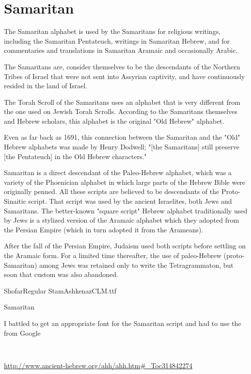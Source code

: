\section{Samaritan}
\label{s:samaritan}
\newfontfamily{}

The Samaritan alphabet is used by the Samaritans for religious writings, including the Samaritan Pentateuch, writings in Samaritan Hebrew, and for commentaries and translations in Samaritan Aramaic and occasionally Arabic.

The Samaritans are, consider themselves to be the descendants of the Northern Tribes of Israel that were not sent into Assyrian captivity, and have continuously resided in the land of Israel.

The Torah Scroll of the Samaritans uses an alphabet that is very different from the one used on Jewish Torah Scrolls. According to the Samaritans themselves and Hebrew scholars, this alphabet is the original "Old Hebrew" alphabet.

Even as far back as 1691, this connection between the Samaritan and the "Old" Hebrew alphabets was made by Henry Dodwell; "[the Samaritans] still preserve [the Pentateuch] in the Old Hebrew characters."

Samaritan is a direct descendant of the Paleo-Hebrew alphabet, which was a variety of the Phoenician alphabet in which large parts of the Hebrew Bible were originally penned. All these scripts are believed to be descendants of the Proto-Sinaitic script. That script was used by the ancient Israelites, both Jews and Samaritans. The better-known "square script" Hebrew alphabet traditionally used by Jews is a stylized version of the Aramaic alphabet which they adopted from the Persian Empire (which in turn adopted it from the Arameans). 

After the fall of the Persian Empire, Judaism used both scripts before settling on the Aramaic form. For a limited time thereafter, the use of paleo-Hebrew (proto-Samaritan) among Jews was retained only to write the Tetragrammaton, but soon that custom was also abandoned.



ShofarRegular StamAshkenazCLM.ttf

\begin{scriptexample}[]{Samaritan}
\bgroup
{}
\egroup
{}
\end{scriptexample}

I battled to get an appropriate font for the Samaritan script and had to use the  from Google


^^A


\url{http://www.ancient-hebrew.org/ahh/ahh.htm#_Toc314842274}


